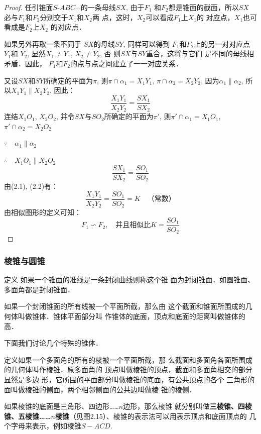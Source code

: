\begin{proof}
任引锥面$S$-$ABC\cdots$的一条母线$SX$, 由于$F_1$
和$F_2$都是锥面的截面，所以$SX$
必与$F_1$和$F_2$分别交于$X_1$和$X_2$两
点，这时，$X_2$可以看成$F_1$上$X_1$的
对应点，$X_1$也可看成是$F_2$上$X_2$
的对应点．

如果另外再取一条不同于
$SX$的母线$SY$, 同样可以得到
$F_1$和$F_2$上的另一对对应点$Y_1$和
$Y_2$, 显然$X_1\ne Y_1$, $X_2\ne Y_2$, 否
则$SX$与$SY$重合，这将与它们
是不同的母线相矛盾．因此，
$F_1$和$F_2$的点与点之间建立了一一对应关系．

又设$SX$和$SY$所确定的平面为$\pi$, 则$\pi\cap \alpha_1=X_1Y_1$,
$\pi\cap \alpha_2=X_2Y_2$, 因为$\alpha_1\parallel \alpha_2$, 所以$X_1Y_1\parallel X_2Y_2$. 因此：
\begin{equation}
    \frac{X_1Y_1}{X_2Y_2}=\frac{SX_1}{SX_2}
\end{equation}
连结$X_1O_1$, $X_2O_2$, 并令$SX$与$SO_2$所确定的平面为$\pi'$, 
则$\pi'\cap\alpha_1=X_1O_1$, $\pi'\cap\alpha_2=X_2O_2$

$\because\quad \alpha_1\parallel \alpha_2$

$\therefore\quad X_1O_1\parallel X_2O_2$
\begin{equation}
    \frac{SX_1}{SX_2}=\frac{SO_1}{SO_2}
\end{equation}
由(2.1), (2.2)有：
\[\frac{X_1Y_1}{X_2Y_2}=\frac{SO_1}{SO_2}=K\quad\text{（常数）}\]
由相似图形的定义可知：
\[F_1\backsim F_2,\quad \text{并且相似比}K=\frac{SO_1}{SO_2}\]
\end{proof}

\subsubsection{棱锥与圆锥}
\begin{blk}
   {定义} 如果一个锥面的准线是一条封闭曲线则称这个锥
面为封闭锥面．如圆锥面、多面角都是封闭锥面．

如果一个封闭锥面的所有线被一个平面所截，那么由
这个截面和锥面所围成的几何体叫做锥体．锥体平面部分叫
作锥体的底面，顶点和底面的距离叫做锥体的高． 
\end{blk}

下面我们讨论几个特殊的锥体．

\begin{blk}
    {定义}如果一个多面角的所有的棱被一个平面所截，那
么截面和多面角各面所围成的几何体叫作棱锥．原多面角的
顶点叫做棱锥的顶点，截面和多面角相交的部分显然是多边
形，它所围的平面部分叫做棱锥的底面，有公共顶点的各个
三角形的面叫做棱锥的侧面，两个相邻侧面的公共边叫做棱
锥的棱侧．

如果棱锥的底面是三角形、四边形……$n$边形，那么棱锥
就分别叫做\textbf{三棱锥、四棱锥、五棱锥……$n$棱锥}（见图2.15）、棱锥的表示法可以用表示顶点和底面顶点的
几个字母来表示，例如棱锥$S-ACD$. 
\end{blk}

